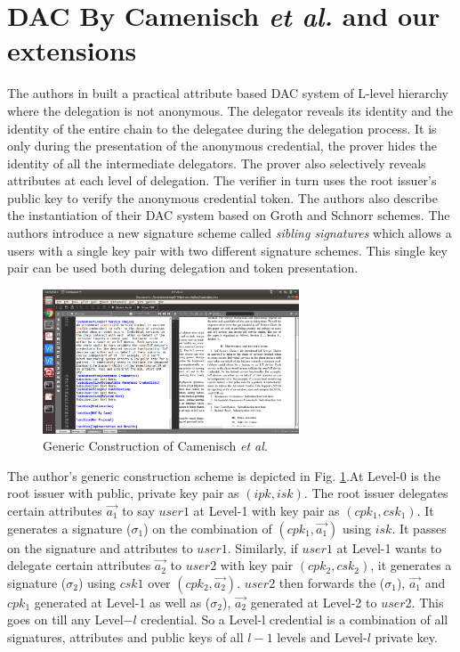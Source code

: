 \documentclass[journal]{IEEEtran}
\begin{document}
\section{DAC By Camenisch \textit{et al.} \cite{CamenischDD17} and our extensions}
The authors in \cite{CamenischDD17} built a practical attribute based DAC system of L-level hierarchy where the delegation is not anonymous. The delegator reveals its identity and the identity of the entire chain to the delegatee during the delegation process. It is only during the presentation of the anonymous credential, the prover hides the identity of all the intermediate delegators. The prover also selectively reveals attributes at each level of delegation. The verifier in turn uses the root issuer's public key to verify the anonymous credential token. The authors also describe the instantiation of their DAC system based on Groth \cite{groth} and Schnorr \cite{rfc8235} schemes. The authors introduce a new signature scheme called \textit{sibling signatures} which allows a users with a single key pair with two different signature schemes. This single key pair can be used both during delegation and token presentation.

\begin{figure}[htbp]
\centerline{\includegraphics[width=3in]{dac.png}}
\caption{Generic Construction of Camenisch \textit{et al.} \cite{CamenischDD17}}
\label{fig:genconst}
\end{figure}

The author's generic construction scheme is depicted in Fig. \ref{fig:genconst}.At Level-0 is the root issuer with public, private key pair as $(ipk,isk)$. The root issuer delegates certain attributes $\overrightarrow{a_1}$ to say $user1$ at Level-1 with key pair as $(cpk_1, csk_1)$. It generates a signature ($\sigma_1$) on the combination of $(cpk_1,\overrightarrow{a_1})$ using $isk$. It passes on the signature and attributes to  $user1$. Similarly, if $user1$ at Level-1 wants to delegate certain attributes $\overrightarrow{a_2}$ to $user2$ with key pair $(cpk_2, csk_2)$, it generates a signature ($\sigma_2$) using $csk1$ over $(cpk_2,\overrightarrow{a_2})$. $user2$ then forwards the ($\sigma_1$), $\overrightarrow{a_1}$ and $cpk_1$ generated at Level-1 as well as ($\sigma_2$), $\overrightarrow{a_2}$ generated at Level-2 to $user2$. This goes on till any Level$-l$ credential. So a Level-l credential is a combination of all signatures, attributes and public keys of all $l-1$ levels and Level-$l$ private key.
\end{document}
